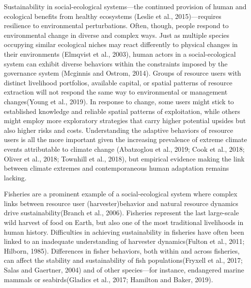 \documentclass[]{elsarticle} %
\begin{document}
Sustainability in social-ecological systems---the continued provision of
human and ecological benefits from healthy ecosystems (Leslie et al.,
2015)---requires resilience to environmental perturbations. Often,
though, people respond to environmental change in diverse and complex
ways. Just as multiple species occupying similar ecological niches may
react differently to physical changes in their environments (Elmqvist et
al., 2003), human actors in a social-ecological system can exhibit
diverse behaviors within the constraints imposed by the governance
system (Mcginnis and Ostrom, 2014). Groups of resource users with
distinct livelihood portfolios, available capital, or spatial patterns
of resource extraction will not respond the same way to environmental or
management changes(Young et al., 2019). In response to change, some
users might stick to established knowledge and reliable spatial patterns
of exploitation, while others might employ more exploratory strategies
that carry higher potential upsides but also higher risks and costs.
Understanding the adaptive behaviors of resource users is all the more
important given the increasing prevalence of extreme climate events
attributable to climate change (Abatzoglou et al., 2019; Cook et al.,
2018; Oliver et al., 2018; Townhill et al., 2018), but empirical
evidence making the link between climate extremes and contemporaneous
human adaptation remains lacking.

Fisheries are a prominent example of a social-ecological system where
complex links between resource user (harvester)behavior and natural
resource dynamics drive sustainability(Branch et al., 2006). Fisheries
represent the last large-scale wild harvest of food on Earth, but also
one of the most traditional livelihoods in human history. Difficulties
in achieving sustainability in fisheries have often been linked to an
inadequate understanding of harvester dynamics(Fulton et al., 2011;
Hilborn, 1985). Differences in fisher behaviors, both within and across
fisheries, can affect the stability and sustainability of fish
populations(Fryxell et al., 2017; Salas and Gaertner, 2004) and of other
species---for instance, endangered marine mammals or seabirds(Gladics et
al., 2017; Hamilton and Baker, 2019).
\end{document}
